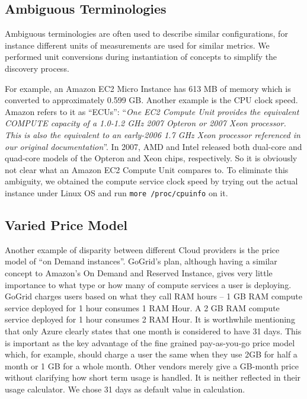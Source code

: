 \subsection{Ambiguous Terminologies}
Ambiguous terminologies are often used to describe similar configurations,
for instance different units of measurements are used for similar metrics.
We performed unit conversions during instantiation of
concepts to simplify the discovery process.

For example, an Amazon EC2 Micro Instance has 613 MB
of memory which is converted to approximately 0.599 GB. Another example is the
CPU clock speed. Amazon refers to it as “ECUs”\cite{AmazonEC2}:
“\textit{One EC2 Compute Unit provides the equivalent COMPUTE capacity of a 1.0-1.2 GHz 2007 Opteron or 2007 Xeon processor. This is also the equivalent to an early-2006 1.7 GHz Xeon processor referenced in our original documentation}”.
In 2007, AMD and Intel released both dual-core and quad-core models of the Opteron and Xeon chips, respectively. So it is obviously not clear what an Amazon EC2 Compute Unit compares to. To eliminate this ambiguity, we obtained the compute service clock speed by trying out the actual instance under Linux OS and run \texttt{more /proc/cpuinfo} on it.

\subsection{Varied Price Model}
Another example of disparity between different Cloud providers is the price model of “on Demand instances”. GoGrid’s plan, although having a similar concept to Amazon’s On Demand and Reserved Instance, gives very little importance to what type or how many of compute services a user is deploying. GoGrid charges users based on what they
call RAM hours – 1 GB RAM compute service deployed for 1 hour consumes 1 RAM Hour. A 2 GB RAM compute service deployed for 1 hour consumes 2 RAM Hour.
It is worthwhile mentioning that only Azure clearly states that one month is considered to have 31 days. This is important as the key advantage of the fine grained pay-as-you-go price model which, for example, should charge a user the same when they use 2GB for
half a month or 1 GB for a whole month. 
Other vendors merely give a GB-month price
without clarifying how short term usage is handled. It is neither reflected in their usage
calculator. We chose 31 days as default value in calculation.

